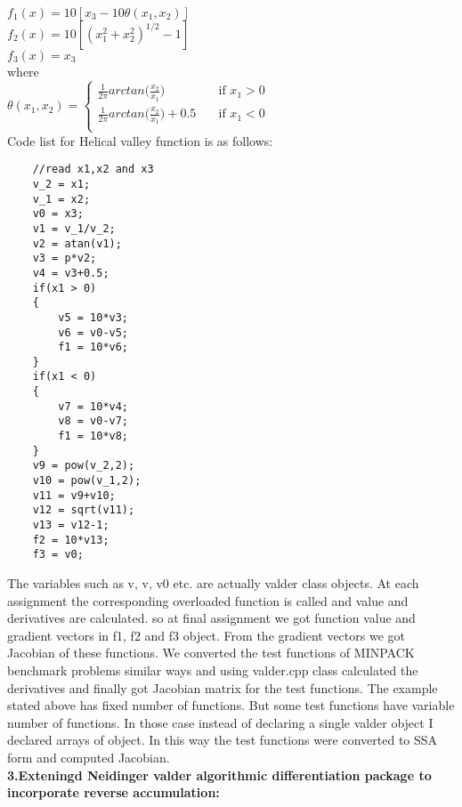 \documentclass[paper=letter, fontsize=12pt]{scrartcl} %
\begin{document}
\begin{enumerate} [align=left,style=nextline,leftmargin=1.5cm,labelsep=\parindent,font=\normalfont]
$f_1(x) = 10[x_3 - 10\theta(x_1,x_2)]$\\
$f_2(x) = 10[({x_1^2 + x_2^2})^{1/2} -1]$\\
$f_3(x) = x_3$\\
\linebreak
\newpage
where\\
 $\theta(x_1,x_2) =
  \begin{cases}
    \frac{1}{2\pi}arctan \big(\frac{x_2}{x_1}\big)       & \quad \text{if } x_1>0 \\
    \frac{1}{2\pi}arctan \big(\frac{x_2}{x_1}\big)+0.5       & \quad \text{if } x_1<0 \\
  \end{cases}
$\\
\newline
\linebreak
Code list for Helical valley function is as follows:\\ 
\begin{lstlisting}
	//read x1,x2 and x3	
	v_2 = x1;
	v_1 = x2;
	v0 = x3;		
	v1 = v_1/v_2;
	v2 = atan(v1);
	v3 = p*v2;
	v4 = v3+0.5;
	if(x1 > 0)
	{
		v5 = 10*v3;
		v6 = v0-v5;
		f1 = 10*v6;
	}
	if(x1 < 0)
	{
		v7 = 10*v4;
		v8 = v0-v7;
		f1 = 10*v8;
	}
	v9 = pow(v_2,2);
	v10 = pow(v_1,2);
	v11 = v9+v10;
	v12 = sqrt(v11);
	v13 = v12-1;
	f2 = 10*v13;
	f3 = v0;
\end{lstlisting}
\end{enumerate}
The variables such as v, v, v0 etc. are actually valder class objects. At each assignment the corresponding overloaded function is called and value and derivatives are calculated. so at final assignment we got function value and gradient vectors in f1, f2 and f3 object. From the gradient vectors we got Jacobian of these functions. We converted the test functions of MINPACK benchmark problems similar ways and using valder.cpp class calculated the derivatives and finally got Jacobian matrix for the test functions. The example stated above has fixed number of functions. But some test functions have variable number of functions. In those case instead of declaring a single valder object I declared arrays of object. In this way the test functions were converted to SSA form and computed Jacobian.\\ 
\newpage
\Large \textbf{3.Exteningd Neidinger valder algorithmic differentiation package to incorporate reverse accumulation:}
\end{document}
